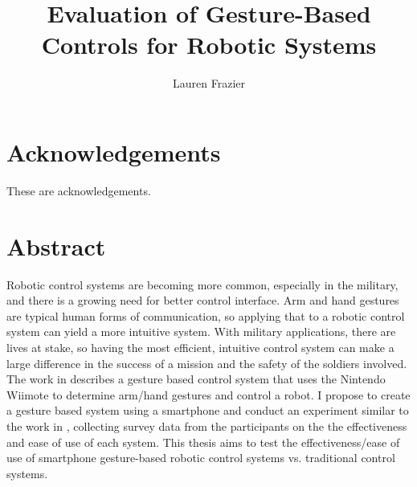 \documentclass[12pt,a4paper]{report}
\author{Lauren Frazier}
\title{Evaluation of Gesture-Based Controls for Robotic Systems}
\begin{document}
\maketitle
\newcommand{\todo}[1]{
    \addcontentsline{tdo}{todo}{\protect{#1}}
    \marginpar{#1}
}

\makeatletter \newcommand {}
  \newcommand\l@todo[2]
    {\par\noindent \textit{#2}, \parbox{10cm}{#1}\par} \makeatother
    
    

\setcounter{page}{1}
\tableofcontents
\listoftables
\listoffigures

\chapter*{Acknowledgements}
These are acknowledgements.

\chapter*{Abstract}
Robotic control systems are becoming more common, especially in the military, and there is a growing need for better control interface. Arm and hand gestures are typical human forms of communication, so applying that to a robotic control system can yield a more intuitive system. With military applications, there are lives at stake, so having the most efficient, intuitive control system can make a large difference in the success of a mission and the safety of the soldiers involved. 
The work in \cite{Varcholik_Barber_Nicholson_2008} describes a gesture based control system that uses the Nintendo Wiimote to determine arm/hand gestures and control a robot. I propose to create a gesture based system using a smartphone and conduct an experiment similar to the work in \cite{Varcholik_Barber_Nicholson_2008}, collecting survey data from the participants on the the effectiveness and ease of use of each system. This thesis aims to test the effectiveness/ease of use of smartphone gesture-based robotic control systems vs. traditional control systems.
\end{document}
